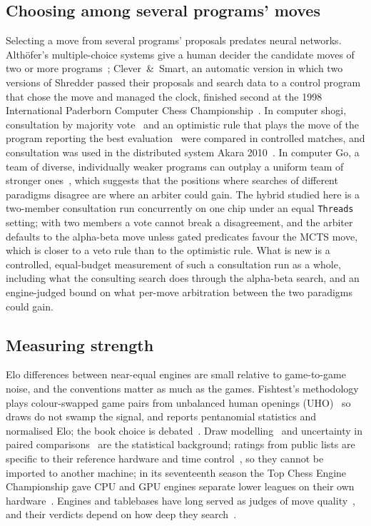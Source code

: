 \documentclass{article}
\begin{document}
\subsection{Choosing among several programs' moves}
Selecting a move from several programs' proposals predates neural networks. Alth\"ofer's multiple-choice systems give a human decider the candidate moves of two or more programs~\cite{althofer2003,althofer2004}; Clever~\&~Smart, an automatic version in which two versions of Shredder passed their proposals and search data to a control program that chose the move and managed the clock, finished second at the 1998 International Paderborn Computer Chess Championship~\cite{cleversmart}. In computer shogi, consultation by majority vote~\cite{obata2011} and an optimistic rule that plays the move of the program reporting the best evaluation~\cite{sugiyama2011} were compared in controlled matches, and consultation was used in the distributed system Akara 2010~\cite{hoki2013}. In computer Go, a team of diverse, individually weaker programs can outplay a uniform team of stronger ones~\cite{marcolino2013,marcolino2014}, which suggests that the positions where searches of different paradigms disagree are where an arbiter could gain. The hybrid studied here is a two-member consultation run concurrently on one chip under an equal \texttt{Threads} setting; with two members a vote cannot break a disagreement, and the arbiter defaults to the alpha-beta move unless gated predicates favour the MCTS move, which is closer to a veto rule than to the optimistic rule. What is new is a controlled, equal-budget measurement of such a consultation run as a whole, including what the consulting search does through the alpha-beta search, and an engine-judged bound on what per-move arbitration between the two paradigms could gain.

\subsection{Measuring strength}
Elo differences between near-equal engines are small relative to game-to-game noise, and the conventions matter as much as the games. Fishtest's methodology~\cite{vdbergh_gsprt,vdbergh_rw,vdbergh_nelo,fishtest} plays colour-swapped game pairs from unbalanced human openings (UHO)~\cite{sfbooks,pohl2024} so draws do not swamp the signal, and reports pentanomial statistics and normalised Elo; the book choice is debated~\cite{uhocritique}. Draw modelling~\cite{szczecinski2020} and uncertainty in paired comparisons~\cite{glickman1999} are the statistical background; ratings from public lists are specific to their reference hardware and time control~\cite{ccrl}, so they cannot be imported to another machine; in its seventeenth season the Top Chess Engine Championship gave CPU and GPU engines separate lower leagues on their own hardware~\cite{haworth2020}. Engines and tablebases have long served as judges of move quality~\cite{guid2006,regan2011,anderson2017}, and their verdicts depend on how deep they search~\cite{ferreira2013}.
\end{document}
